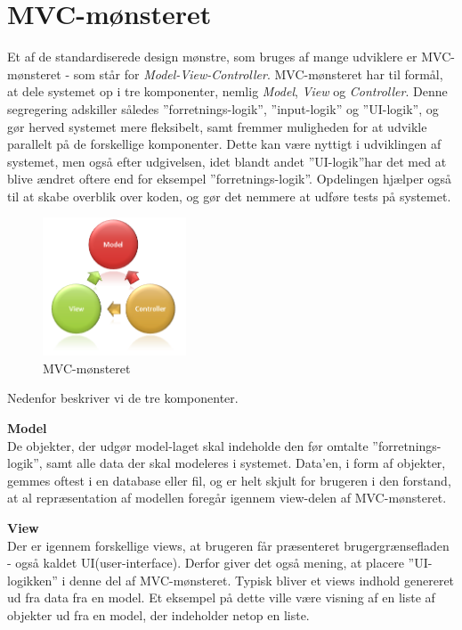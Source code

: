 \section{MVC-mønsteret}\label{MVC}
Et af de standardiserede design mønstre, som bruges af mange udviklere er MVC-mønsteret - som står for \textit{Model-View-Controller}.
MVC-mønsteret har til formål, at dele systemet op i tre komponenter, nemlig \textit{Model}, \textit{View} og \textit{Controller}.
Denne segregering adskiller således ''forretnings-logik'', ''input-logik'' og ''UI-logik'', og gør herved systemet mere fleksibelt, samt fremmer muligheden for at udvikle parallelt på de forskellige komponenter.
Dette kan være nyttigt i udviklingen af systemet, men også efter udgivelsen, idet blandt andet ''UI-logik''har det med at blive ændret oftere end for eksempel ''forretnings-logik''.
Opdelingen hjælper også til at skabe overblik over koden, og gør det nemmere at udføre tests på systemet. \citep{MVC_Overview}

\begin{figure}
	\vspace{-20pt}
	\begin{center}
		\includegraphics[width=0.38\textwidth]{images/Images/mvc.png}
	\end{center}
	\vspace{-20pt}
	\caption{MVC-mønsteret}
	\vspace{-20pt}
\end{figure}


Nedenfor beskriver vi de tre komponenter.

\textbf{Model}\\
De objekter, der udgør model-laget skal indeholde den før omtalte ''forretnings-logik'', samt alle data der skal modeleres i systemet.
Data'en, i form af objekter, gemmes oftest i en database eller fil, og er helt skjult for brugeren i den forstand, at al repræsentation af modellen foregår igennem view-delen af MVC-mønsteret.

\textbf{View}\\
Der er igennem forskellige views, at brugeren får præsenteret brugergrænsefladen - også kaldet UI(user-interface).
Derfor giver det også mening, at placere ''UI-logikken'' i denne del af MVC-mønsteret.
Typisk bliver et views indhold genereret ud fra data fra en model.
Et eksempel på dette ville være visning af en liste af objekter ud fra en model, der indeholder netop en liste.

